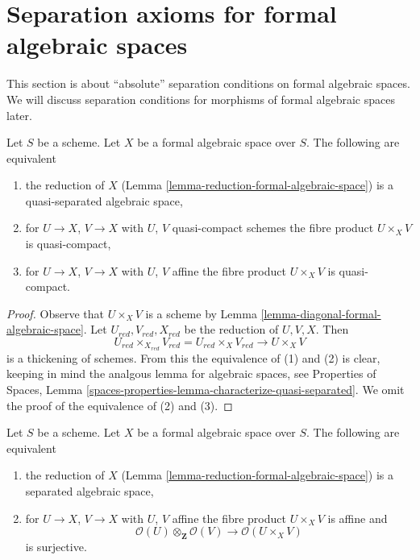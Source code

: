 \section{Separation axioms for formal algebraic spaces}
\label{section-separation}

\noindent
This section is about ``absolute'' separation conditions on formal algebraic
spaces. We will discuss separation conditions for morphisms of formal
algebraic spaces later.

\begin{lemma}
\label{lemma-characterize-quasi-separated}
Let $S$ be a scheme. Let $X$ be a formal algebraic space over $S$.
The following are equivalent
\begin{enumerate}
\item the reduction of $X$
(Lemma \ref{lemma-reduction-formal-algebraic-space}) is a
quasi-separated algebraic space,
\item for $U \to X$, $V \to X$ with $U$, $V$ quasi-compact schemes
the fibre product $U \times_X V$ is quasi-compact,
\item for $U \to X$, $V \to X$ with $U$, $V$ affine
the fibre product $U \times_X V$ is quasi-compact.
\end{enumerate}
\end{lemma}

\begin{proof}
Observe that $U \times_X V$ is a scheme by
Lemma \ref{lemma-diagonal-formal-algebraic-space}.
Let $U_{red}, V_{red}, X_{red}$ be the reduction of $U, V, X$.
Then
$$
U_{red} \times_{X_{red}} V_{red} = U_{red} \times_X V_{red} \to U \times_X V
$$
is a thickening of schemes. From this the equivalence of (1) and (2)
is clear, keeping in mind the analgous lemma for algebraic spaces, see
Properties of Spaces, Lemma
\ref{spaces-properties-lemma-characterize-quasi-separated}.
We omit the proof of the equivalence of (2) and (3).
\end{proof}

\begin{lemma}
\label{lemma-characterize-separated}
Let $S$ be a scheme. Let $X$ be a formal algebraic space over $S$.
The following are equivalent
\begin{enumerate}
\item the reduction of $X$
(Lemma \ref{lemma-reduction-formal-algebraic-space}) is a separated
algebraic space,
\item for $U \to X$, $V \to X$ with $U$, $V$ affine
the fibre product $U \times_X V$ is affine and
$$
\mathcal{O}(U) \otimes_\mathbf{Z} \mathcal{O}(V)
\longrightarrow
\mathcal{O}(U \times_X V)
$$
is surjective.
\end{enumerate}
\end{lemma}

